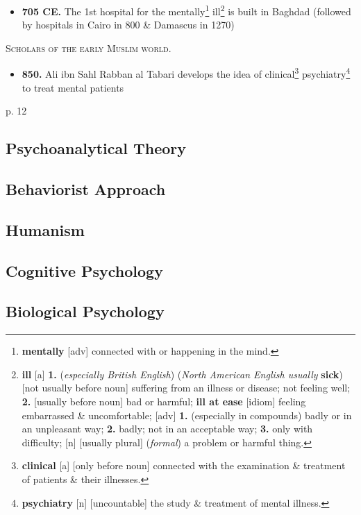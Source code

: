 \documentclass[oneside]{book}
\numberwithin{equation}{section}
\begin{document}
\begin{itemize}
	\item \textbf{705 CE.} The 1st hospital for the mentally\footnote{\textbf{mentally} [adv] connected with or happening in the mind.} ill\footnote{\textbf{ill} [a] \textbf{1.} (\textit{especially British English}) (\textit{North American English usually} \textbf{sick}) [not usually before noun] suffering from an illness or disease; not feeling well; \textbf{2.} [usually before noun] bad or harmful; \textbf{ill at ease} [idiom] feeling embarrassed \& uncomfortable; [adv] \textbf{1.} (especially in compounds) badly or in an unpleasant way; \textbf{2.} badly; not in an acceptable way; \textbf{3.} only with difficulty; [n] [usually plural] (\textit{formal}) a problem or harmful thing.} is built in Baghdad (followed by hospitals in Cairo in 800 \& Damascus in 1270)
\end{itemize}
\textsc{Scholars of the early Muslim world.}
\begin{itemize}
	\item \textbf{850.} Ali ibn Sahl Rabban al Tabari develops the idea of clinical\footnote{\textbf{clinical} [a] [only before noun] connected with the examination \& treatment of patients \& their illnesses.} psychiatry\footnote{\textbf{psychiatry} [n] [uncountable] the study \& treatment of mental illness.} to treat mental patients
\end{itemize}
p. 12

\subsection{Psychoanalytical Theory}

\subsection{Behaviorist Approach}

\subsection{Humanism}

\subsection{Cognitive Psychology}

\subsection{Biological Psychology}
\end{document}
